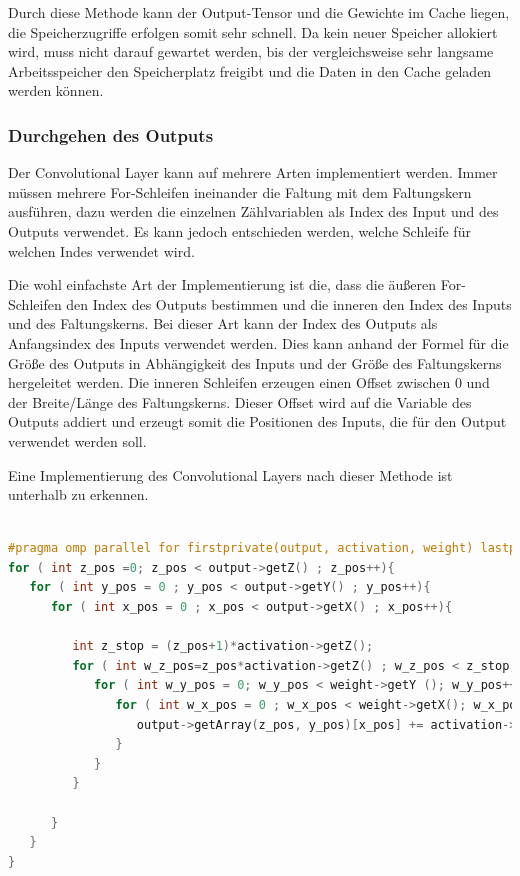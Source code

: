 \documentclass[../main.tex]{subfiles}
\begin{document}
Durch diese Methode kann der Output-Tensor und die Gewichte im Cache liegen, die Speicherzugriffe erfolgen somit sehr schnell. Da kein neuer Speicher allokiert wird, muss nicht darauf gewartet werden, bis der vergleichsweise sehr langsame Arbeitsspeicher den Speicherplatz freigibt und die Daten in den Cache geladen werden können. 

\subsubsection{Durchgehen des Outputs}

Der Convolutional Layer kann auf mehrere Arten implementiert werden. Immer müssen mehrere For-Schleifen ineinander die Faltung mit dem Faltungskern ausführen, dazu werden die einzelnen Zählvariablen als Index des Input und des Outputs verwendet. Es kann jedoch entschieden werden, welche Schleife für welchen Indes verwendet wird.

Die wohl einfachste Art der Implementierung ist die, dass die äußeren For-Schleifen den Index des Outputs bestimmen und die inneren den Index des Inputs und des Faltungskerns. Bei dieser Art kann der Index des Outputs als Anfangsindex des Inputs verwendet werden. Dies kann anhand der Formel für die Größe des Outputs in Abhängigkeit des Inputs und der Größe des Faltungskerns hergeleitet werden. Die inneren Schleifen erzeugen einen Offset zwischen 0 und der Breite/Länge des Faltungskerns. Dieser Offset wird auf die Variable des Outputs addiert und erzeugt somit die Positionen des Inputs, die für den Output verwendet werden soll.

Eine Implementierung des Convolutional Layers nach dieser Methode ist unterhalb zu erkennen.
\begin{lstlisting}[language=c++, caption=Convolution: Output durchgehen, captionpos=b, label=listing:conv_output, frame=single, linewidth=\textwidth, breaklines=true]

#pragma omp parallel for firstprivate(output, activation, weight) lastprivate(output, activation, weight)
for ( int z_pos =0; z_pos < output->getZ() ; z_pos++){
   for ( int y_pos = 0 ; y_pos < output->getY() ; y_pos++){
      for ( int x_pos = 0 ; x_pos < output->getX() ; x_pos++){
         
         int z_stop = (z_pos+1)*activation->getZ();
         for ( int w_z_pos=z_pos*activation->getZ() ; w_z_pos < z_stop; w_z_pos++){
            for ( int w_y_pos = 0; w_y_pos < weight->getY (); w_y_pos++){
               for ( int w_x_pos = 0 ; w_x_pos < weight->getX(); w_x_pos++){
                  output->getArray(z_pos, y_pos)[x_pos] += activation->getArray(z_pos%activation->getZ(), y_pos+w_y_pos)[x_pos+w_x_pos] * weight->getArray(w_z_pos, w_y_pos )[w_x_pos] ;
               }
            }
         }
      
      }
   }
}
\end{lstlisting}
\end{document}
